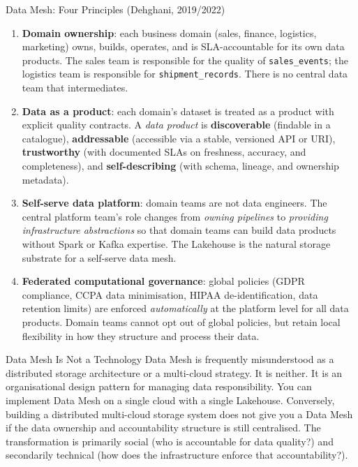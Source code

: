 \begin{defbox}{Data Mesh: Four Principles (Dehghani, 2019/2022)}
\begin{enumerate}
  \item \textbf{Domain ownership}: each business domain (sales, finance,
        logistics, marketing) owns, builds, operates, and is SLA-accountable
        for its own data products. The sales team is responsible for the
        quality of \texttt{sales\_events}; the logistics team is responsible
        for \texttt{shipment\_records}. There is no central data team that
        intermediates.
  \item \textbf{Data as a product}: each domain's dataset is treated as
        a product with explicit quality contracts. A \emph{data product}
        is \textbf{discoverable} (findable in a catalogue), \textbf{addressable}
        (accessible via a stable, versioned API or URI), \textbf{trustworthy}
        (with documented SLAs on freshness, accuracy, and completeness),
        and \textbf{self-describing} (with schema, lineage, and ownership
        metadata).
  \item \textbf{Self-serve data platform}: domain teams are not data
        engineers. The central platform team's role changes from
        \emph{owning pipelines} to \emph{providing infrastructure
        abstractions} so that domain teams can build data products without
        Spark or Kafka expertise. The Lakehouse is the natural storage
        substrate for a self-serve data mesh.
  \item \textbf{Federated computational governance}: global policies
        (GDPR compliance, CCPA data minimisation, HIPAA de-identification,
        data retention limits) are enforced \emph{automatically} at the
        platform level for all data products. Domain teams cannot opt out
        of global policies, but retain local flexibility in how they
        structure and process their data.
\end{enumerate}
\end{defbox}

\begin{caution}{Data Mesh Is Not a Technology}
Data Mesh is frequently misunderstood as a distributed storage architecture
or a multi-cloud strategy. It is neither. It is an organisational design
pattern for managing data responsibility. You can implement Data Mesh on
a single cloud with a single Lakehouse. Conversely, building a distributed
multi-cloud storage system does not give you a Data Mesh if the data
ownership and accountability structure is still centralised. The
transformation is primarily social (who is accountable for data quality?)
and secondarily technical (how does the infrastructure enforce that
accountability?).
\end{caution}

